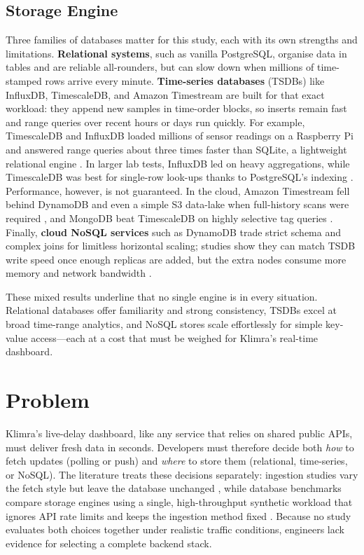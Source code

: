 \documentclass[nomenclature, english, biblatex]{kththesis}
\numberwithin{listing}{chapter}
\begin{document}
\subsection{Storage Engine}
Three families of databases matter for this study, each with its own strengths and limitations.
\textbf{Relational systems}, such as vanilla PostgreSQL, organise data in tables and are reliable all-rounders, but can slow down when millions of time-stamped rows arrive every minute.
\textbf{Time-series databases} (\glspl{TSDB}) like InfluxDB, TimescaleDB, and Amazon Timestream are built for that exact workload: they append new samples in time-order blocks, so inserts remain fast and range queries over recent hours or days run quickly. For example, TimescaleDB and InfluxDB loaded millions of sensor readings on a Raspberry Pi and answered range queries about three times faster than SQLite, a lightweight relational engine \cite{Grzesik2020EdgeIoTBenchmark}. In larger lab tests, InfluxDB led on heavy aggregations, while TimescaleDB was best for single-row look-ups thanks to PostgreSQL's indexing \cite{Daqouri2023TimeseriesVsSQL,Heldt2021SciTS}. Performance, however, is not guaranteed. In the cloud, Amazon Timestream fell behind DynamoDB and even a simple S3 data-lake when full-history scans were required \cite{Johansson2022AWSCloudData}, and MongoDB beat TimescaleDB on highly selective tag queries \cite{Mohamed2024DBMSComparison}.
Finally, \textbf{cloud NoSQL services} such as DynamoDB trade strict schema and complex joins for limitless horizontal scaling; studies show they can match \gls{TSDB} write speed once enough replicas are added, but the extra nodes consume more memory and network bandwidth \cite{Zhang2023EdgeTSDB,Vergara2021PerformanceTSDB}.

These mixed results underline that no single engine is  in every situation. Relational databases offer familiarity and strong consistency, \glspl{TSDB} excel at broad time-range analytics, and NoSQL stores scale effortlessly for simple key-value access—each at a cost that must be weighed for Klimra's real-time dashboard.





\section{Problem}
\label{sec:problem}

Klimra's live-delay dashboard, like any service that relies on shared public \glspl{API}, must deliver fresh data in seconds. Developers must therefore decide both \textit{how} to fetch updates (polling or push) and \textit{where} to store them (relational, time-series, or NoSQL). The literature treats these decisions separately: ingestion studies vary the fetch style but leave the database unchanged \cite{Trindade2021EDAImpact,Lewis2020PowerOfEDA}, while database benchmarks compare storage engines using a single, high-throughput synthetic workload that ignores \gls{API} rate limits and keeps the ingestion method fixed \cite{Heldt2021SciTS,Grzesik2020EdgeIoTBenchmark}. Because no study evaluates both choices together under realistic traffic conditions, engineers lack evidence for selecting a complete backend stack.
\end{document}
